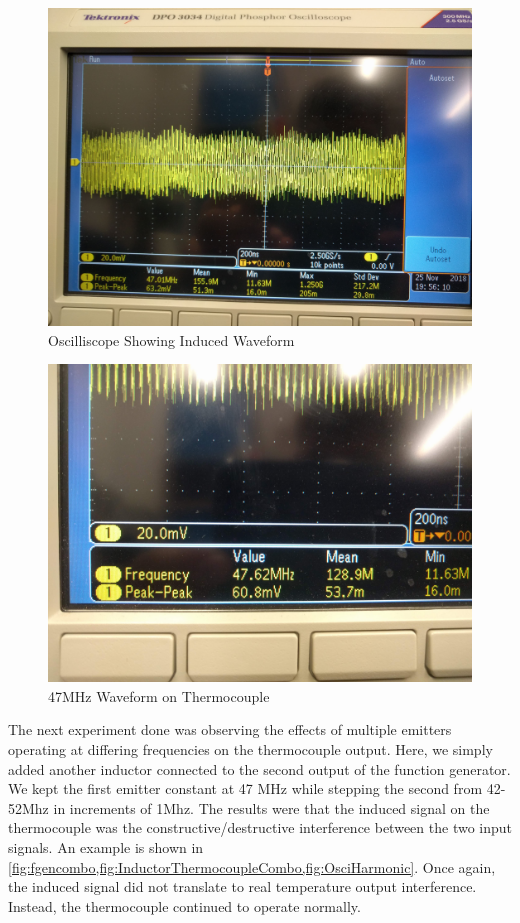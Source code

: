 \begin{figure}
    \centering
    \includegraphics[width=\linewidth]{pictures/Osci-47.jpg}
    \caption{Oscilliscope Showing Induced Waveform}
    \label{fig:Osci47}
\end{figure}
\begin{figure}
    \centering
    \includegraphics[width=\linewidth]{pictures/Osci-47-2.jpg}
    \caption{47MHz Waveform on Thermocouple}
    \label{fig:Osci47-2}
\end{figure}

The next experiment done was observing the effects of multiple emitters operating at differing frequencies on the thermocouple output. Here, we simply added another inductor connected to the second output of the function generator. We kept the first emitter constant at 47 MHz while stepping the second from 42-52Mhz in increments of 1Mhz. The results were that the induced signal on the thermocouple was the constructive/destructive interference between the two input signals. An example is shown in \cref{fig:fgencombo,fig:InductorThermocoupleCombo,fig:OsciHarmonic}. Once again, the induced signal did not translate to real temperature output interference. Instead, the thermocouple continued to operate normally. 

